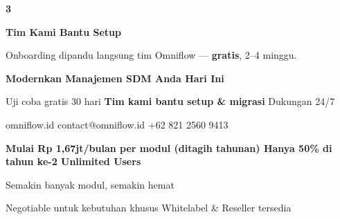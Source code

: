 \documentclass[a4paper]{article}
\begin{document}
\begin{center}
\begin{minipage}[t]{0.318\textwidth}
{\begin{minipage}[t][4.7cm][c]{\dimexpr\linewidth-2\fboxsep\relax}
            \begin{center}{\fontsize{22}{26}\selectfont\bfseries\color{BluePrimary} 3}\end{center}
            \vspace{2pt}
            \begin{center}
                {\fontsize{10}{13}\selectfont\bfseries\color{BlueDark} Tim Kami Bantu Setup}\par\vspace{3pt}
                {\fontsize{9}{12}\selectfont\color{TextDark} Onboarding dipandu langsung tim Omniflow --- \textbf{gratis}, 2--4 minggu.}
            \end{center}
        \end{minipage}}
\end{minipage}
\end{center}

\vspace{8pt}

{\setlength{\fboxsep}{10pt}\setlength{\fboxrule}{0pt}%
\noindent\colorbox{BluePrimary}{%
    \begin{minipage}{\dimexpr\textwidth-2\fboxsep\relax}
        \centering
        {\fontsize{13}{16}\selectfont\bfseries\color{White} Modernkan Manajemen SDM Anda Hari Ini}\par\vspace{3pt}
        {\fontsize{9.5}{12}\selectfont\color{BlueMid} Uji coba gratis 30 hari \enspace\textbullet\enspace \textbf{Tim kami bantu setup \& migrasi} \enspace\textbullet\enspace Dukungan 24/7}\par\vspace{2pt}
        {\fontsize{9.5}{12}\selectfont\color{BlueLight} omniflow.id \enspace\textbullet\enspace contact@omniflow.id \enspace\textbullet\enspace +62 821 2560 9413}
    \end{minipage}}}


\vspace{6pt}

{\setlength{\fboxsep}{8pt}\setlength{\fboxrule}{0pt}%
\noindent\colorbox{BlueBg}{%
    \begin{minipage}{\dimexpr\textwidth-2\fboxsep\relax}
        \centering
        {\fontsize{9}{12}\selectfont\bfseries\color{BluePrimary}
        Mulai Rp 1,67jt/bulan per modul (ditagih tahunan) \enspace\textbullet\enspace Hanya 50\% di tahun ke-2 \enspace\textbullet\enspace Unlimited Users}\par\vspace{1pt}
        {\fontsize{8.5}{11}\selectfont\color{BlueDark}
        Semakin banyak modul, semakin hemat}\par\vspace{1pt}
        {\fontsize{8}{10}\selectfont\color{TextLight}
        Negotiable untuk kebutuhan khusus \enspace\textbullet\enspace Whitelabel \& Reseller tersedia}
    \end{minipage}}}

\restoregeometry
\pagestyle{empty}
\end{document}
